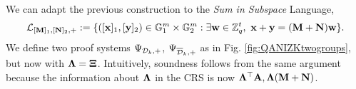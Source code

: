 We can adapt the previous construction to the \textit{Sum in Subspace} Language, 
 $$\mathcal{L}_{[\mathbf{{M}}]_1,[\mathbf{{N}}]_2,+}:=\{ ([\mathbf{x}]_1,[\mathbf{y}]_2) \in \mathbb{G}_1^{m} \times \mathbb{G}_2^{m} :  \exists \mathbf{w} \in \mathbb{Z}_q^{t}, \  \mathbf{x}+\mathbf{y}=(\mathbf{{M}}+\mathbf{{N}}) \mathbf{w}\}.$$
 We define two proof systems $\Psi_{\mathcal{D}_k,+}$, $\Psi_{\overline{\mathcal{D}}_k,+}$ as in Fig. \ref{fig:QANIZKtwogroups}, but now 
with $\mathbf{{\Lambda}}=\mathbf{{\Xi}}$. 
Intuitively, soundness follows from the same argument 
because the information 
about $\mathbf{{\Lambda}}$ in the CRS is now $\mathbf{{\Lambda}}^{\top}\mathbf{{A}},\mathbf{{\Lambda}}(\mathbf{{M}}+\mathbf{{N}})$.
